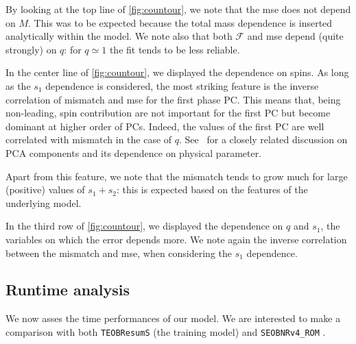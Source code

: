 \par
By looking at the top line of \ref{fig:countour}, we note that the mse does not depend on $M$. This was to be expected because the total mass dependence is inserted analytically within the model.
We note also that both $\mathcal{F}$ and mse depend (quite strongly) on $q$: for $q\simeq 1$ the fit tends to be less reliable.
\par
In the center line of \ref{fig:countour}, we displayed the dependence on spins.
As long as the $s_1$ dependence is considered, the most striking feature is the inverse correlation of mismatch and mse for the first phase PC.
This means that, being non-leading, spin contribution are not important for the first PC but become dominant at higher order of PCs.
Indeed, the values of the first PC are well correlated with mismatch in the case of $q$. See~\cite{Ohme2013PCA_GW} for a closely related discussion on PCA components and its dependence on physical parameter.
\par
Apart from this feature, we note that the mismatch tends to grow much for large (positive) values of $s_1+s_2$: this is expected based on the features of the underlying model.
\par
In the third row of \ref{fig:countour}, we displayed the dependence on $q$ and $s_1$, the variables on which the error depends more.
We note again the inverse correlation between the mismatch and mse, when considering the $s_1$ dependence.
\subsection{Runtime analysis} \label{sec:runtime}
We now asses the time performances of our model.
We are interested to make a comparison with both \texttt{TEOBResumS}
(the training model) and \texttt{SEOBNRv4\_ROM} \cite{Bohe:2016gbl}.
%
